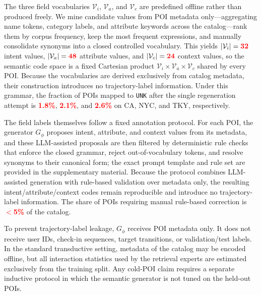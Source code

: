 \documentclass[journal]{IEEEtran}
\newcommand{\mock}[1]{\textbf{\textcolor{red}{#1}}}
\begin{document}
The three field vocabularies $\mathcal{V}_{i}$, $\mathcal{V}_{a}$, and
$\mathcal{V}_{c}$ are predefined offline rather than produced freely. We mine
candidate values from POI metadata only---aggregating name tokens, category
labels, and attribute keywords across the catalog---rank them by corpus
frequency, keep the most frequent expressions, and manually consolidate
synonyms into a closed controlled vocabulary. This yields
$|\mathcal{V}_{i}|=\mock{32}$ intent values, $|\mathcal{V}_{a}|=\mock{48}$
attribute values, and $|\mathcal{V}_{c}|=\mock{24}$ context values, so the
semantic code space is a fixed Cartesian product
$\mathcal{V}_{i}\times\mathcal{V}_{a}\times\mathcal{V}_{c}$ shared by every POI.
Because the vocabularies are derived exclusively from catalog metadata, their
construction introduces no trajectory-label information. Under this grammar,
the fraction of POIs mapped to \texttt{UNK} after the single regeneration
attempt is \mock{1.8\%}, \mock{2.1\%}, and \mock{2.6\%} on CA, NYC, and TKY,
respectively.

The field labels themselves follow a fixed annotation protocol. For each POI, the
generator $G_{\phi}$ proposes intent, attribute, and context values from its
metadata, and these LLM-assisted proposals are then filtered by deterministic
rule checks that enforce the closed grammar, reject out-of-vocabulary tokens, and
resolve synonyms to their canonical form; the exact prompt template and rule set
are provided in the supplementary material. Because the protocol combines
LLM-assisted generation with rule-based validation over metadata only, the
resulting intent/attribute/context codes remain reproducible and introduce no
trajectory-label information. The share of POIs requiring manual rule-based
correction is \mock{$<$5\%} of the catalog.

To prevent trajectory-label leakage, $G_{\phi}$ receives POI metadata only.
It does not receive user IDs, check-in sequences, target transitions, or
validation/test labels.
In the standard transductive setting, metadata of the catalog may be encoded
offline, but all interaction statistics used by the retrieval experts are
estimated exclusively from the training split.
Any cold-POI claim requires a separate inductive protocol in which the
semantic generator is not tuned on the held-out POIs.
\end{document}
